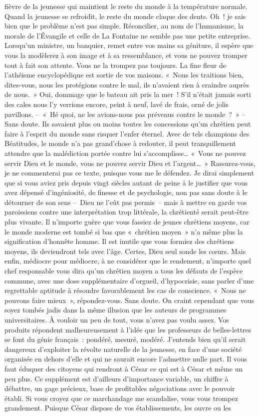 \documentclass[french,twoside]{book} %
\begin{document}
fièvre de la jeunesse qui maintient le reste du monde à la température normale. Quand la jeunesse se refroidit, le reste du monde claque des dents. Oh ! je sais bien que le problème n’est pas simple. Réconcilier, au nom de l’humanisme, la morale de l’Évangile et celle de La Fontaine ne semble pas une petite entreprise. Lorsqu’un ministre, un banquier, remet entre vos mains sa géniture, il espère que vous la modèlerez à son image et à sa ressemblance, et vous ne pouvez tromper tout à fait son attente. Vous ne la trompez pas toujours. La fine fleur de l’athéisme encyclopédique est sortie de vos maisons. « Nous les traitions bien, dites-vous, nous les protégions contre le mal, ils n’avaient rien à craindre auprès de nous. » Oui, dommage que le bateau ait pris la mer ! S’il n’était jamais sorti des cales nous l’y verrions encore, peint à neuf, lavé de frais, orné de jolis pavillons. – « Hé quoi, ne les avions-nous pas prévenus contre le monde ? » – Sans doute. Ils savaient plus ou moins toutes les concessions qu’un chrétien peut faire à l’esprit du monde sans risquer l’enfer éternel. Avec de tels champions des Béatitudes, le monde n’a pas grand’chose à redouter, il peut tranquillement attendre que la malédiction portée contre lui s’accomplisse… « Vous ne pouvez servir Dieu et le monde, vous ne pouvez servir Dieu et l’argent… » Rassurez-vous, je ne commenterai pas ce texte, puisque vous me le défendez. Je dirai simplement que si vous aviez pris depuis vingt siècles autant de peine à le justifier que vous avez dépensé d’ingéniosité, de finesse et de psychologie, non pas sans doute à le détourner de son sens – Dieu ne l’eût pas permis – mais à mettre en garde vos paroissiens contre une interprétation trop littérale, la chrétienté serait peut-être plus vivante. Il n’importe guère que vous fassiez de jeunes chrétiens moyens, car le monde moderne est tombé si bas que « chrétien moyen » n’a même plus la signification d’honnête homme. Il est inutile que vous formiez des chrétiens moyens, ils deviendront tels avec l’âge. Certes, Dieu seul sonde les cœurs. Mais enfin, médiocre pour médiocre, à ne considérer que le rendement, n’importe quel chef responsable vous dira qu’un chrétien moyen a tous les défauts de l’espèce commune, avec une dose supplémentaire d’orgueil, d’hypocrisie, sans parler d’une regrettable aptitude à résoudre favorablement les cas de conscience. « Nous ne pouvons faire mieux », répondez-vous. Sans doute. On craint cependant que vous soyez tombés jadis dans la même illusion que les auteurs de programmes universitaires. À vouloir un peu de tout, vous n’avez pas voulu assez. Vos produits répondent malheureusement à l’idée que les professeurs de belles-lettres se font du génie français : pondéré, mesuré, modéré. J’entends bien qu’il serait dangereux d’exploiter la révolte naturelle de la jeunesse, en face d’une société organisée en dehors d’elle et qui ne saurait encore l’admettre nulle part. Il vous faut éduquer des citoyens qui rendront à César ce qui est à César et même un peu plus. Ce supplément est d’ailleurs d’importance variable, un chiffre à débattre, un gage précieux, base de profitables négociations avec le pouvoir établi. Si vous croyez que ce marchandage me scandalise, vous vous trompez grandement. Puisque César dispose de vos établissements, les ouvre ou les 
\end{document}
